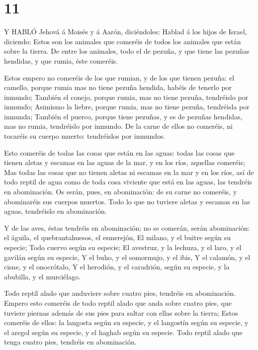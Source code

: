 \hypertarget{section-10}{%
\section{11}\label{section-10}}

 Y HABLÓ Jehová á Moisés y á Aarón, diciéndoles:
 Hablad á los hijos de Israel, diciendo: Estos son los
animales que comeréis de todos los animales que están sobre la tierra.
 De entre los animales, todo el de pezuña, y que tiene las
pezuñas hendidas, y que rumia, éste comeréis.

 Estos empero no comeréis de los que rumian, y de los que
tienen pezuña: el camello, porque rumia mas no tiene pezuña hendida,
habéis de tenerlo por inmundo;  También el conejo, porque
rumia, mas no tiene pezuña, tendréislo por inmundo; 
Asimismo la liebre, porque rumia, mas no tiene pezuña, tendréisla por
inmunda;  También el puerco, porque tiene pezuñas, y es de
pezuñas hendidas, mas no rumia, tendréislo por inmundo.  De
la carne de ellos no comeréis, ni tocaréis su cuerpo muerto: tendréislos
por inmundos.

 Esto comeréis de todas las cosas que están en las aguas:
todas las cosas que tienen aletas y escamas en las aguas de la mar, y en
los ríos, aquellas comeréis;  Mas todas las cosas que no
tienen aletas ni escamas en la mar y en los ríos, así de todo reptil de
agua como de toda cosa viviente que está en las aguas, las tendréis en
abominación.  Os serán, pues, en abominación: de su carne
no comeréis, y abominaréis sus cuerpos muertos.  Todo lo
que no tuviere aletas y escamas en las aguas, tendréislo en abominación.

 Y de las aves, éstas tendréis en abominación; no se
comerán, serán abominación: el águila, el quebrantahuesos, el esmerejón,
 El milano, y el buitre según su especie; 
Todo cuervo según su especie;  El avestruz, y la lechuza, y
el laro, y el gavilán según su especie,  Y el buho, y el
somormujo, y el ibis,  Y el calamón, y el cisne, y el
onocrótalo,  Y el herodión, y el caradrión, según su
especie, y la abubilla, y el murciélago.

 Todo reptil alado que anduviere sobre cuatro pies,
tendréis en abominación.  Empero esto comeréis de todo
reptil alado que anda sobre cuatro pies, que tuviere piernas además de
sus pies para saltar con ellas sobre la tierra;  Estos
comeréis de ellos: la langosta según su especie, y el langostín según su
especie, y el aregol según su especie, y el haghab según su especie.
 Todo reptil alado que tenga cuatro pies, tendréis en
abominación.

